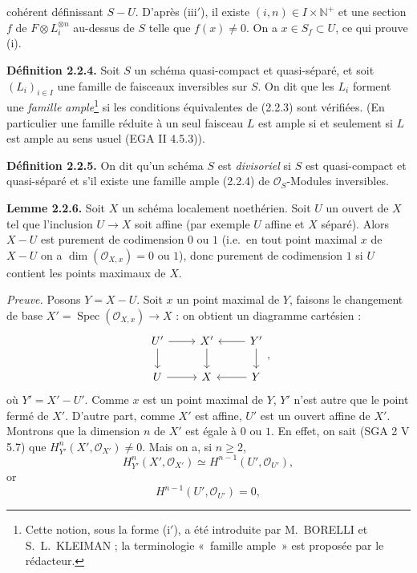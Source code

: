 cohérent
définissant $S-U$. D'après (iii$'$), il existe $(i,n)\in I\times\mathbb N^+$ et une section $f$ de $F\otimes L_i^{\otimes n}$ au-dessus de $S$ telle que $f(x)\ne0$. On a $x\in S_f\subset U$, ce qui prouve (i).

\textbf{Définition 2.2.4.} Soit $S$ un schéma quasi-compact et quasi-séparé, et soit $(L_i)_{i\in I}$ une famille de faisceaux inversibles sur $S$. On dit que les $L_i$ forment une \emph{famille ample}\footnote{Cette notion, sous la forme (i$'$), a été introduite par M.~BORELLI et S.~L.~KLEIMAN ; la terminologie «~famille ample~» est proposée par le rédacteur.} si les conditions équivalentes de (2.2.3) sont vérifiées. (En particulier une famille réduite à un seul faisceau $L$ est ample si et seulement si $L$ est ample au sens usuel (EGA II 4.5.3)).

\textbf{Définition 2.2.5.} On dit qu'un schéma $S$ est \emph{divisoriel} si $S$ est quasi-compact et quasi-séparé et s'il existe une famille ample (2.2.4) de $\mathcal O_S$-Modules inversibles.

\textbf{Lemme 2.2.6.} Soit $X$ un schéma localement noethérien. Soit $U$ un ouvert de $X$ tel que l'inclusion $U\to X$ soit affine (par exemple $U$ affine et $X$ séparé). Alors $X-U$ est purement de codimension $0$ ou $1$ (i.e.\ en tout point maximal $x$ de $X-U$ on a $\dim(\mathcal O_{X,x})=0$ ou $1$), donc purement de codimension $1$ si $U$ contient les points maximaux de $X$.

\emph{Preuve.} Posons $Y=X-U$. Soit $x$ un point maximal de $Y$, faisons le changement de base $X'=\operatorname{Spec}(\mathcal O_{X,x})\to X$ : on obtient un diagramme cartésien :
\[
\begin{tikzcd}
U' \arrow[r] \arrow[d] & X' \arrow[d] & Y' \arrow[l] \arrow[d] \\
U \arrow[r] & X & Y \arrow[l]
\end{tikzcd},
\]
où $Y'=X'-U'$. Comme $x$ est un point maximal de $Y$, $Y'$ n'est autre que le point fermé de $X'$. D'autre part, comme $X'$ est affine, $U'$ est un ouvert affine de $X'$. Montrons que la dimension $n$ de $X'$ est égale à $0$ ou $1$. En effet, on sait (SGA 2 V 5.7) que $H^n_{Y'}(X',\mathcal O_{X'})\ne0$. Mais on a, si $n\ge2$,
\[
H^n_{Y'}(X',\mathcal O_{X'})\simeq H^{n-1}(U',\mathcal O_{U'}),
\]
or
\[
H^{n-1}(U',\mathcal O_{U'})=0,
\]

